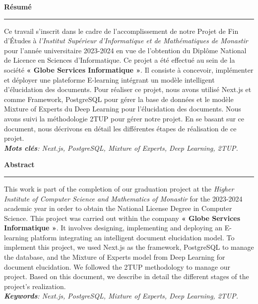 \thispagestyle{empty}

\begin{center}
  \textbf{\Huge Résumé}
\end{center}
\noindent\rule{\textwidth}{0.1pt}
Ce travail s’inscrit dans le cadre de l’accomplissement de notre Projet de Fin d’Études à \textit{l’Institut Supérieur d'Informatique et de Mathématiques de Monastir} pour l’année universitaire 2023-2024 en vue de l'obtention du Diplôme National de Licence en Sciences d’Informatique. Ce projet a été effectué au sein de la société \textbf{« Globe Services Informatique »}. Il consiste à concevoir, implémenter et déployer une plateforme E-learning intégrant un modèle intelligent d’élucidation des documents. Pour réaliser ce projet, nous avons utilisé Next.js et comme Framework, PostgreSQL pour gérer la base de données et le modèle Mixture of Experts du Deep Learning pour l’élucidation des documents. Nous avons suivi la méthodologie 2TUP pour gérer notre projet. En se basant sur ce document, nous décrivons en détail les différentes étapes de réalisation de ce projet.\\
\textit{\textbf{Mots clés}: Next.js, PostgreSQL, Mixture of Experts, Deep Learning, 2TUP.}

\vspace{5em}

\begin{center}
    \textbf{\Huge Abstract}
\end{center}
\noindent\rule{\textwidth}{0.1pt}
This work is part of the completion of our graduation project at the \textit{Higher Institute of Computer Science and Mathematics of Monastir} for the 2023-2024 academic year in order to obtain the National License Degree in Computer Science. This project was carried out within the company \textbf{« Globe Services Informatique »}. It involves designing, implementing and deploying an E-learning platform integrating an intelligent document elucidation model. To implement  this project, we used Next.js as the framework, PostgreSQL to manage the database, and the Mixture of Experts model from Deep Learning for document elucidation. We followed the 2TUP methodology to manage our project. Based on this document, we describe in detail the different stages of the project's realization.\\
\textit{\textbf{Keywords}: Next.js, PostgreSQL, Mixture of Experts, Deep Learning, 2TUP.}
